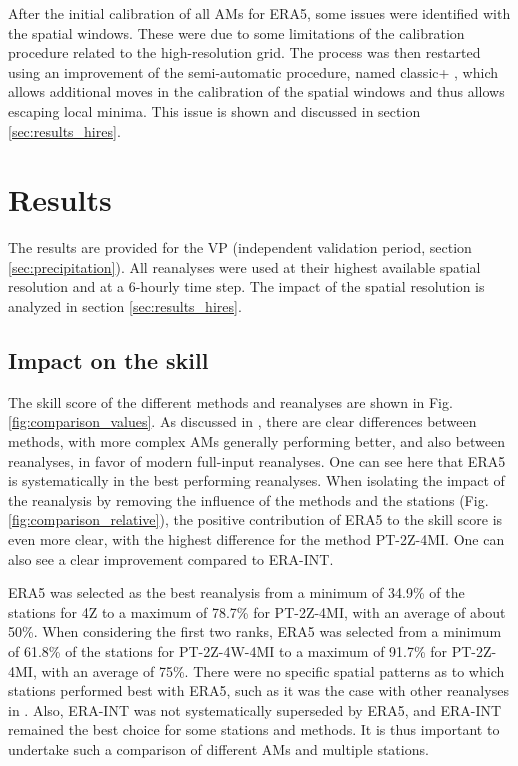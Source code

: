 \documentclass[alpha-refs]{wiley-article}
\begin{document}
After the initial calibration of all AMs for ERA5, some issues were identified with the spatial windows. These were due to some limitations of the calibration procedure related to the high-resolution grid. The process was then restarted using an improvement of the semi-automatic procedure, named classic+ \citep{Horton2019}, which allows additional moves in the calibration of the spatial windows and thus allows escaping local minima. This issue is shown and discussed in section \ref{sec:results_hires}.


\section{Results}
\label{sec:results}

The results are provided for the VP (independent validation period, section \ref{sec:precipitation}). All reanalyses were used at their highest available spatial resolution and at a 6-hourly time step. The impact of the spatial resolution is analyzed in section \ref{sec:results_hires}.

\subsection{Impact on the skill}
\label{sec:results_skill}

The skill score of the different methods and reanalyses are shown in Fig. \ref{fig:comparison_values}. As discussed in \citet{Horton2018b}, there are clear differences between methods, with more complex AMs generally performing better, and also between reanalyses, in favor of modern full-input reanalyses. One can see here that ERA5 is systematically in the best performing reanalyses. When isolating the impact of the reanalysis by removing the influence of the methods and the stations (Fig. \ref{fig:comparison_relative}), the positive contribution of ERA5 to the skill score is even more clear, with the highest difference for the method PT-2Z-4MI. One can also see a clear improvement compared to ERA-INT.

ERA5 was selected as the best reanalysis from a minimum of 34.9\% of the stations for 4Z to a maximum of 78.7\% for PT-2Z-4MI, with an average of about 50\%. When considering the first two ranks, ERA5 was selected from a minimum of 61.8\% of the stations for PT-2Z-4W-4MI to a maximum of 91.7\% for PT-2Z-4MI, with an average of 75\%. There were no specific spatial patterns as to which stations performed best with ERA5, such as it was the case with other reanalyses in \citet{Horton2018b}. Also, ERA-INT was not systematically superseded by ERA5, and ERA-INT remained the best choice for some stations and methods. It is thus important to undertake such a comparison of different AMs and multiple stations.
\end{document}
